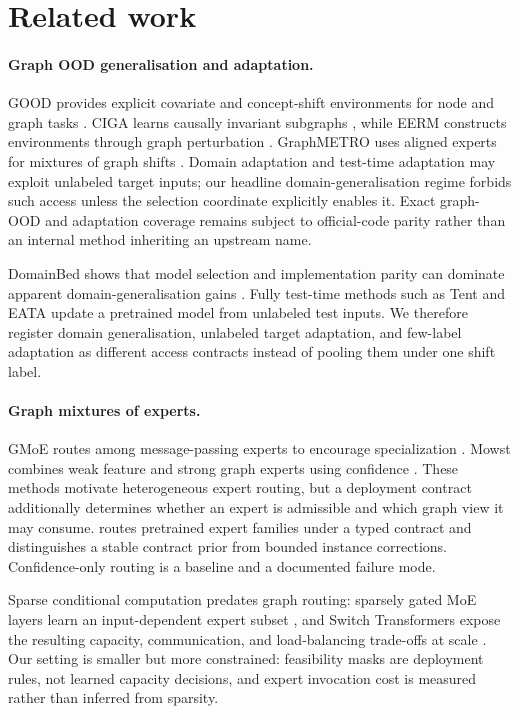 \section{Related work}

\paragraph{Graph OOD generalisation and adaptation.}
GOOD provides explicit covariate and concept-shift environments for node and graph tasks \cite{gui2022good}. CIGA learns causally invariant subgraphs \cite{chen2022ciga}, while EERM constructs environments through graph perturbation \cite{wu2022eerm}. GraphMETRO uses aligned experts for mixtures of graph shifts \cite{wu2024graphmetro}. Domain adaptation and test-time adaptation may exploit unlabeled target inputs; our headline domain-generalisation regime forbids such access unless the selection coordinate explicitly enables it. Exact graph-OOD and adaptation coverage remains subject to official-code parity rather than an internal method inheriting an upstream name.

DomainBed shows that model selection and implementation parity can dominate apparent domain-generalisation gains \cite{gulrajani2021domainbed}. Fully test-time methods such as Tent \cite{wang2021tent} and EATA \cite{niu2022eata} update a pretrained model from unlabeled test inputs. We therefore register domain generalisation, unlabeled target adaptation, and few-label adaptation as different access contracts instead of pooling them under one shift label.

\paragraph{Graph mixtures of experts.}
GMoE routes among message-passing experts to encourage specialization \cite{wang2023gmoe}. Mowst combines weak feature and strong graph experts using confidence \cite{zeng2024mowst}. These methods motivate heterogeneous expert routing, but a deployment contract additionally determines whether an expert is admissible and which graph view it may consume. \method{} routes pretrained expert families under a typed contract and distinguishes a stable contract prior from bounded instance corrections. Confidence-only routing is a baseline and a documented failure mode.

Sparse conditional computation predates graph routing: sparsely gated MoE layers learn an input-dependent expert subset \cite{shazeer2017moe}, and Switch Transformers expose the resulting capacity, communication, and load-balancing trade-offs at scale \cite{fedus2022switch}. Our setting is smaller but more constrained: feasibility masks are deployment rules, not learned capacity decisions, and expert invocation cost is measured rather than inferred from sparsity.


